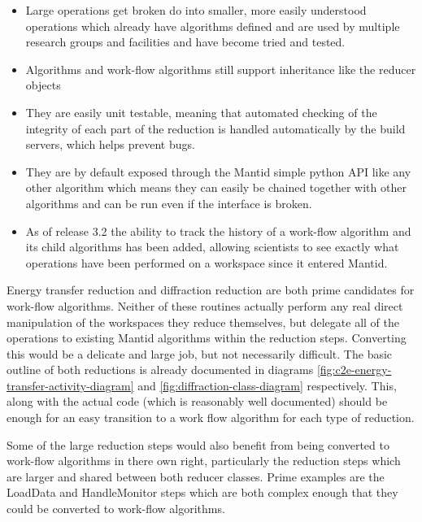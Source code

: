 \documentclass[paper=a4, fontsize=11pt]{scrartcl}	%
\numberwithin{equation}{section}															%
\numberwithin{figure}{section}																%
\numberwithin{table}{section}																%
\begin{document}
\begin{itemize}
\item Large operations get broken do into smaller, more easily understood operations which already have algorithms defined and are used by multiple research groups and facilities and have become tried and tested.

\item Algorithms and work-flow algorithms still support inheritance like the reducer objects

\item They are easily unit testable, meaning that automated checking of the integrity of each part of the reduction is handled automatically by the build servers, which helps prevent bugs.

\item They are by default exposed through the Mantid simple python API like any other algorithm which means they can easily be chained together with other algorithms and can be run even if the interface is broken.

\item As of release 3.2 the ability to track the history of a work-flow algorithm and its child algorithms has been added, allowing scientists to see exactly what operations have been performed on a workspace since it entered Mantid.
\end{itemize}

Energy transfer reduction and diffraction reduction are both prime candidates for work-flow algorithms. Neither of these routines actually perform any real direct manipulation of the workspaces they reduce themselves, but delegate all of the operations to existing Mantid algorithms within the reduction steps. Converting this would be a delicate and large job, but not necessarily difficult. The basic outline of both reductions is already documented in diagrams \ref{fig:c2e-energy-transfer-activity-diagram} and \ref{fig:diffraction-class-diagram} respectively. This, along with the actual code (which is reasonably well documented) should be enough for an easy transition to a work flow algorithm for each type of reduction.

Some of the large reduction steps would also benefit from being converted to work-flow algorithms in there own right, particularly the reduction steps which are larger and shared between both reducer classes. Prime examples are the LoadData and HandleMonitor steps which are both complex enough that they could be converted to work-flow algorithms.
\end{document}
